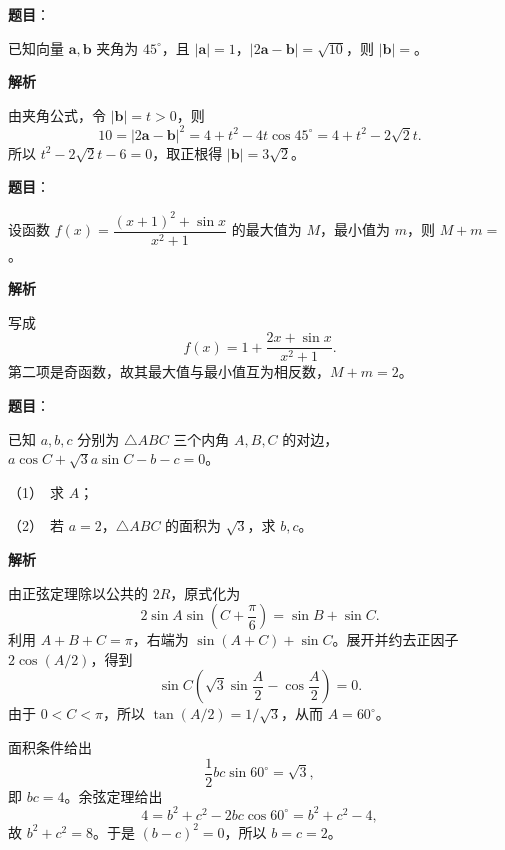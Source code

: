 \begin{answer}

\textbf{题目}：

已知向量 $\boldsymbol a,\boldsymbol b$ 夹角为 $45^\circ$，且 $|\boldsymbol a|=1$，$|2\boldsymbol a-\boldsymbol b|=\sqrt{10}$，则 $|\boldsymbol b|=$\gkblank{}。

\textbf{解析}

由夹角公式，令 $|\boldsymbol b|=t>0$，则
\nopagebreak[4]
\[
10=|2\boldsymbol a-\boldsymbol b|^2
=4+t^2-4t\cos45^\circ
=4+t^2-2\sqrt2t.
\]
所以 $t^2-2\sqrt2t-6=0$，取正根得 $|\boldsymbol b|=3\sqrt2$。


\end{answer}
\begin{answer}

\textbf{题目}：

设函数 $f(x)=\dfrac{(x+1)^2+\sin x}{x^2+1}$ 的最大值为 $M$，最小值为 $m$，则 $M+m=$\gkblank{}。

\textbf{解析}

写成
\nopagebreak[4]
\[
f(x)=1+\frac{2x+\sin x}{x^2+1}.
\]
第二项是奇函数，故其最大值与最小值互为相反数，$M+m=2$。


\end{answer}
\begin{answer}

\textbf{题目}：

已知 $a,b,c$ 分别为 $\triangle ABC$ 三个内角 $A,B,C$ 的对边，$a\cos C+\sqrt3a\sin C-b-c=0$。

（1）　求 $A$；

（2）　若 $a=2$，$\triangle ABC$ 的面积为 $\sqrt3$，求 $b,c$。

\textbf{解析}


由正弦定理除以公共的 $2R$，原式化为
\nopagebreak[4]
\[
2\sin A\sin\left(C+\frac\pi6\right)=\sin B+\sin C.
\]
利用 $A+B+C=\pi$，右端为 $\sin(A+C)+\sin C$。展开并约去正因子 $2\cos(A/2)$，得到
\nopagebreak[4]
\[
\sin C\left(\sqrt3\sin\frac A2-\cos\frac A2\right)=0.
\]
由于 $0<C<\pi$，所以 $\tan(A/2)=1/\sqrt3$，从而 $A=60^\circ$。


面积条件给出
\nopagebreak[4]
\[
\frac12bc\sin60^\circ=\sqrt3,
\]
即 $bc=4$。余弦定理给出
\nopagebreak[4]
\[
4=b^2+c^2-2bc\cos60^\circ=b^2+c^2-4,
\]
故 $b^2+c^2=8$。于是 $(b-c)^2=0$，所以 $b=c=2$。



\end{answer}

